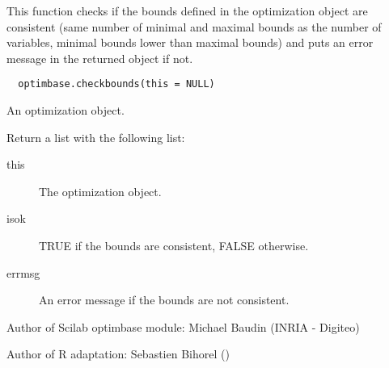 %
\begin{Description}\relax
This function checks if the bounds defined in the optimization object are
consistent (same number of minimal and maximal bounds as the number of
variables, minimal bounds lower than maximal bounds) and puts an error
message in the returned object if not.
\end{Description}
%
\begin{Usage}
\begin{verbatim}
  optimbase.checkbounds(this = NULL)
\end{verbatim}
\end{Usage}
%
\begin{Arguments}
\begin{ldescription}
\item[\code{this}] An optimization object.
\end{ldescription}
\end{Arguments}
%
\begin{Value}
Return a list with the following list: \begin{description}

\item[this] The optimization object.
\item[isok] TRUE if the bounds are consistent, FALSE otherwise.
\item[errmsg] An error message if the bounds are not consistent.

\end{description}

\end{Value}
%
\begin{Author}\relax
Author of Scilab optimbase module: Michael Baudin (INRIA - Digiteo)

Author of R adaptation: Sebastien Bihorel ()
\end{Author}
